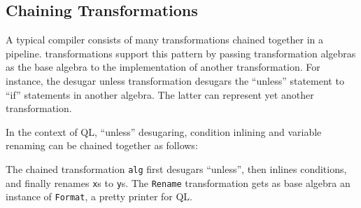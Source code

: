 


\subsection{Chaining Transformations}
\label{SECT:chaining}

A typical compiler consists of many transformations chained together in a pipeline.
\name transformations support this pattern by passing transformation algebras as the base algebra to the implementation of another transformation.
For instance, the desugar unless transformation desugars the ``unless'' statement to ``if'' statements in another algebra.
The latter can represent yet another transformation.

In the context of QL, ``unless'' desugaring, condition inlining and variable renaming can be chained together as follows:


The chained transformation \lstinline{alg} first desugars ``unless'', then inlines conditions, and finally renames \lstinline{x}s to \lstinline{y}s.
The \lstinline{Rename} transformation gets as base algebra an instance of \lstinline{Format}, a pretty printer for QL.

